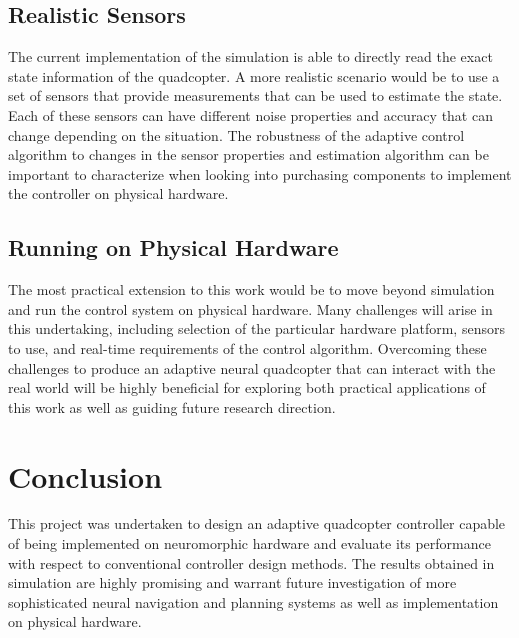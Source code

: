 \documentclass[letterpaper,12pt,titlepage,oneside,final]{book}
\begin{document}

\subsection{Realistic Sensors}

The current implementation of the simulation is able to directly read the exact state information of the quadcopter.
A more realistic scenario would be to use a set of sensors that provide measurements that can be used to estimate the state.
Each of these sensors can have different noise properties and accuracy that can change depending on the situation.
The robustness of the adaptive control algorithm to changes in the sensor properties and estimation algorithm can be important to characterize when looking into purchasing components to implement the controller on physical hardware.


\subsection{Running on Physical Hardware}

The most practical extension to this work would be to move beyond simulation and run the control system on physical hardware.
Many challenges will arise in this undertaking, including selection of the particular hardware platform, sensors to use, and real-time requirements of the control algorithm.
Overcoming these challenges to produce an adaptive neural quadcopter that can interact with the real world will be highly beneficial for exploring both practical applications of this work as well as guiding future research direction.

\section{Conclusion}

This project was undertaken to design an adaptive quadcopter controller capable of being implemented on neuromorphic hardware and evaluate its performance with respect to conventional controller design methods.
The results obtained in simulation are highly promising and warrant future investigation of more sophisticated neural navigation and planning systems as well as implementation on physical hardware.
\end{document}
